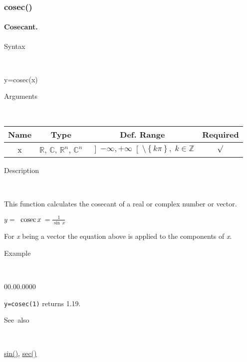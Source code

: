 \newpage
\subsubsection*{\hypertarget{cosec}{}{\Large cosec()}}


\paragraph{\label{par:Cosecant}Cosecant.}

\begin{description}
\item [Syntax]~
\end{description}
y=cosec(x)

\begin{description}
\item [Arguments]~
\end{description}
\begin{tabular}{|c|c|c|c|}
\hline 
Name&
Type&
Def. Range&
Required\tabularnewline
\hline
\hline 
x&
$\mathbb{R}$, $\mathbb{C}$, $\mathbb{R}^{n}$, $\mathbb{C}^{n}$&
$\left]-\infty,+\infty\right[\setminus\left\{ k\pi\right\} ,\; k\in\mathbb{Z}$&
$\surd$\tabularnewline
\hline
\end{tabular}

\begin{description}
\item [Description]~
\end{description}
This function calculates the cosecant of a real or complex number
or vector.

\medskip{}
$y=$$\textrm{\, cosec}\, x\,$$={\displaystyle \frac{1}{\sin\, x}}$
\medskip{}

For \textit{x} being a vector the equation above is applied
to the components of \textit{x}.

\begin{description}
\item [Example]~
\end{description}
\begin{lyxlist}{00.00.0000}
\item [\texttt{y=cosec(1)}]returns 1.19.
\end{lyxlist}
\begin{description}
\item [See~also]~
\end{description}
\textcolor{blue}{\hyperlink{sin}{sin()}}\textcolor{black}{,} \textcolor{blue}{\hyperlink{sec}{sec()}}


\newpage
